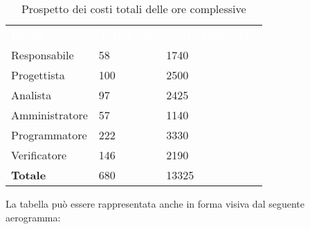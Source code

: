 \begin{table}[H]
\begin{center}
\renewcommand{\arraystretch}{1.5}
\begin{tabular}{ m{}<{\centering}  m{}<{\centering} m{}<{\centering}}
	\rowcolor{darkblue}
	\textcolor{white}{\textbf{Ruolo}}&\textcolor{white}{\textbf{Totale ore}}&\textcolor{white}{\textbf{Costo totale (\euro)}}\\ 

	Responsabile  & 58 & 1740 \\	
	
	Progettista & 100 & 2500 \\
	
	Analista & 97 & 2425 \\

	Amministratore & 57 & 1140 \\
	
	Programmatore & 222 & 3330 \\
	
	Verificatore & 146 & 2190 \\
	
	\textbf{Totale} & 680 & 13325 \\
	
\end{tabular}
\caption{Prospetto dei costi totali delle ore complessive}
\end{center}
\end{table}

La tabella può essere rappresentata anche in forma visiva dal seguente aerogramma:




